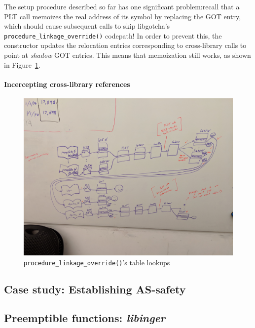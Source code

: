 The setup procedure described so far has one significant problem:\@ recall that a PLT
call memoizes the real address of its symbol by replacing the GOT entry, which should
cause subsequent calls to skip libgotcha's \texttt{procedure\_linkage\_override()}
codepath!  In order to prevent this, the constructor updates the relocation entries
corresponding to cross-library calls to point at \textit{shadow} GOT entries.  This
means that memoization still works, as shown in Figure~\ref{fig:override}.

\paragraph{Incercepting cross-library references}



\begin{figure}
\includegraphics[width=\columnwidth]{figs/tables}
\caption{\texttt{procedure\_linkage\_override()}'s table lookups}
\label{fig:override}
\end{figure}

\subsection{Case study: Establishing AS-safety}
\label{sec:statefulness}

\subsection{Preemptible functions: \textit{libinger}}
\label{sec:libinger}

